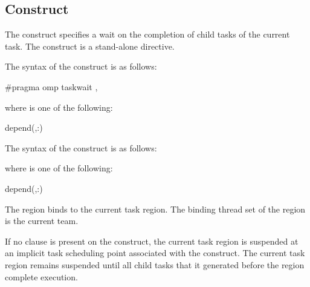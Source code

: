 \subsection{ Construct}
\label{subsec:taskwait Construct}
\summary
The  construct specifies a wait on the completion of child tasks
of the current task. The  construct is a stand-alone directive.

\syntax
\begin{ccppspecific}
The syntax of the  construct is as follows:

\begin{ompcPragma}
#pragma omp taskwait \plc{[clause[ [},\plc{] clause] ... ] new-line}
\end{ompcPragma}

where  is one of the following:

\begin{indentedcodelist}
depend(\plc{[depend-modifier},\plc{]dependence-type }:)
\end{indentedcodelist}
\end{ccppspecific}

\begin{fortranspecific}
The syntax of the  construct is as follows:


where  is one of the following:

\begin{indentedcodelist}
depend(\plc{[depend-modifier},\plc{]dependence-type }:)
\end{indentedcodelist}

\end{fortranspecific}

\binding
The  region binds to the current task region. The binding thread 
set of the  region is the current team.

\descr

If no  clause is present on the  construct, the
current task region is suspended at an implicit task scheduling point
associated with the construct. The current task region remains suspended until
all child tasks that it generated before the  region complete
execution.

